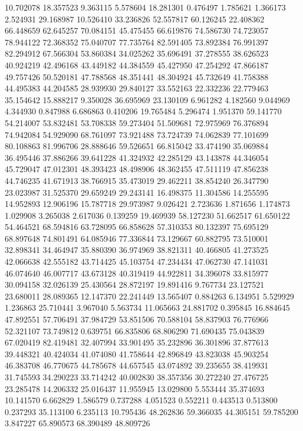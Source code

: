 10.702078
18.357523
9.363115
5.578604
18.281301
0.476497
1.785621
1.366173
2.524931
29.168987
10.526410
33.236826
52.557817
60.126245
22.408362
66.448659
62.645257
70.084151
45.475455
66.619876
74.586730
74.723057
78.944122
72.368352
75.040707
77.735764
82.591405
73.892384
76.991397
82.294912
67.566304
53.860384
34.025262
35.696491
37.278555
38.626523
40.924219
42.496168
43.449182
44.384559
45.427950
47.254292
47.866187
49.757426
50.520181
47.788568
48.351441
48.304924
45.732649
41.758388
44.495383
44.204585
28.939930
29.840127
33.552163
22.332236
22.779463
35.154642
15.888217
9.350028
36.695969
23.130109
6.961282
4.182560
9.044969
4.344930
0.847988
6.686863
0.410206
19.765484
5.296474
1.951370
59.141770
54.214007
53.832481
53.708338
59.273404
51.509681
72.975969
76.376894
74.942084
54.929090
68.761097
73.921488
73.724739
74.062839
77.101699
80.108863
81.996706
28.888646
59.526651
66.815042
33.474190
35.069884
36.495446
37.886266
39.641228
41.324932
42.285129
43.143878
44.346054
45.729047
47.012301
48.393423
48.498906
48.362455
47.511119
47.856238
44.746235
41.671913
38.766915
35.473019
29.462211
38.854240
26.347790
23.023987
31.525370
29.659249
29.243141
16.498375
11.304586
14.255595
14.952893
12.906196
15.787718
29.973987
9.026421
2.723636
1.871656
1.174873
1.029908
3.265038
2.617036
0.139259
19.469939
58.127230
51.662517
61.650122
54.464521
68.594816
63.728095
66.858628
57.310353
80.132397
75.695129
68.897648
74.801491
64.085946
77.336844
73.129667
60.882795
73.510001
32.898341
34.464947
35.880390
36.974969
38.821311
40.466805
41.273525
42.066638
42.555182
43.714425
45.103754
47.234434
47.062730
47.141031
46.074640
46.007717
43.673128
40.319419
44.922811
34.396078
33.815977
30.094158
32.026139
25.430564
28.872197
19.891416
9.767734
23.127521
23.680011
28.089365
12.147370
22.241449
13.565407
0.884263
6.134951
5.529929
1.236863
25.710441
3.967040
5.563734
11.065663
24.881702
0.395845
16.884645
47.892551
57.706491
37.984729
53.851506
70.588104
58.837903
76.776966
52.321107
73.749812
0.639751
66.835806
68.806290
71.690435
75.043839
67.020419
82.419481
32.407994
33.901495
35.232896
36.301896
37.877613
39.448321
40.424034
41.074080
41.758644
42.896849
43.823038
45.903254
46.383708
46.770675
44.785678
44.657545
43.074892
39.235655
38.419931
31.745593
34.290223
33.714242
40.002830
38.357356
30.272240
27.476725
23.285478
14.206332
25.016437
11.955945
13.029800
5.553444
35.374693
10.141570
6.662829
1.586579
0.737288
4.051523
0.552211
0.443513
0.513800
0.237293
35.113100
6.235113
10.795436
48.262836
59.366035
44.305151
59.785200
3.847227
65.890573
68.390489
48.809726
